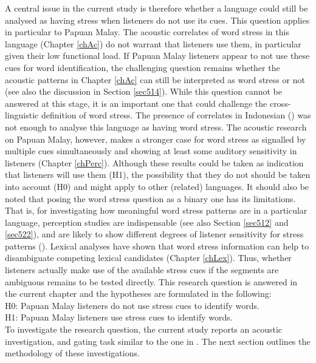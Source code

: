 A central issue in the current study is therefore whether a language could still be analysed as having stress when listeners do not use its cues. This question applies in particular to Papuan Malay. The acoustic correlates of word stress in this language (Chapter \ref{chAc}) do not warrant that listeners use them, in particular given their low functional load. If Papuan Malay listeners appear to not use these cues for word identification, the challenging question remains whether the acoustic patterns in Chapter \ref{chAc} can still be interpreted as word stress or not (see also the discussion in Section \ref{sec514}). While this question cannot be answered at this stage, it is an important one that could challenge the cross-linguistic definition of word stress. The presence of correlates in Indonesian (\citealt{vanzanten_word_1998}) was not enough to analyse this language as having word stress. The acoustic research on Papuan Malay, however, makes a stronger case for word stress as signalled by multiple cues simultaneously and showing at least some auditory sensitivity in listeners (Chapter \ref{chPerc}). Although these results could be taken as indication that listeners will use them (H1), the possibility that they do not should be taken into account (H0) and might apply to other (related) languages. It should also be noted that posing the word stress question as a binary one has its limitations. That is, for investigating how meaningful word stress patterns are in a particular language, perception studies are indispensable (see also Section \ref{sec512} and \ref{sec522}), and are likely to show different degrees of listener sensitivity for stress patterns (\citealt{peperkamp_perception_2010}). Lexical analyses have shown that word stress information can help to disambiguate competing lexical candidates (Chapter \ref{chLex}). Thus, whether listeners actually make use of the available stress cues if the segments are ambiguous remains to be tested directly. This research question is answered in the current chapter and the hypotheses are formulated in the following:\\

H0: Papuan Malay listeners do not use stress cues to identify words.\\ 

H1: Papuan Malay listeners use stress cues to identify words.\\

To investigate the research question, the current study reports an acoustic investigation, and gating task similar to the one in \citet{vanzanten_word_1998}. The next section outlines the methodology of these investigations.

